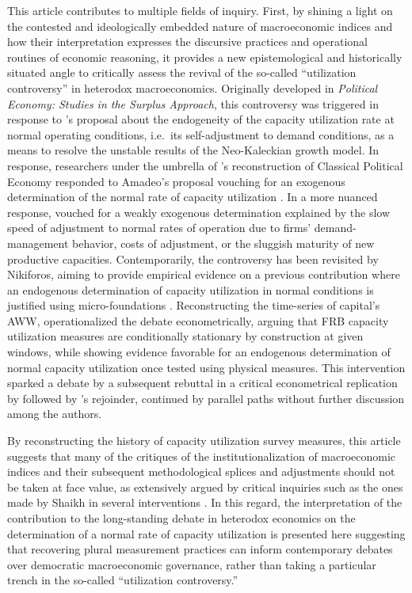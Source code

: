 \documentclass[11pt]{article}
\begin{document}
This article contributes to multiple fields of inquiry. First, by shining a light on the contested and ideologically embedded nature of macroeconomic indices and how their interpretation expresses the discursive practices and operational routines of economic reasoning, it provides a new epistemological and historically situated angle to critically assess the revival of the so-called ``utilization controversy'' in heterodox macroeconomics. Originally developed in \emph{Political Economy: Studies in the Surplus Approach}, this controversy was triggered in response to \citet{amadeo1986}'s proposal about the endogeneity of the capacity utilization rate at normal operating conditions, i.e.\ its self-adjustment to demand conditions, as a means to resolve the unstable results of the Neo-Kaleckian growth model. In response, researchers under the umbrella of \citet{sraffa1960}'s reconstruction of Classical Political Economy responded to Amadeo's proposal vouching for an exogenous determination of the normal rate of capacity utilization \citep{kurz1986}. In a more nuanced response, \citet{ciccone1986} vouched for a weakly exogenous determination explained by the slow speed of adjustment to normal rates of operation due to firms' demand-management behavior, costs of adjustment, or the sluggish maturity of new productive capacities. Contemporarily, the controversy has been revisited by Nikiforos, aiming to provide empirical evidence on a previous contribution where an endogenous determination of capacity utilization in normal conditions is justified using micro-foundations \citep{nikiforos2013}. Reconstructing the time-series of capital's AWW, \citet{nikiforos2016} operationalized the debate econometrically, arguing that FRB capacity utilization measures are conditionally stationary by construction at given windows, while showing evidence favorable for an endogenous determination of normal capacity utilization once tested using physical measures. This intervention sparked a debate by a subsequent rebuttal in a critical econometrical replication by \citet{gahnGonzalez2020} followed by \citet{nikiforos2020}'s rejoinder, continued by parallel paths without further discussion among the authors.

By reconstructing the history of capacity utilization survey measures, this article suggests that many of the critiques of the institutionalization of macroeconomic indices and their subsequent methodological splices and adjustments should not be taken at face value, as extensively argued by critical inquiries such as the ones made by Shaikh in several interventions \citep{shaikh1992,shaikhmoudud2004,shaikh2016}. In this regard, the interpretation of the contribution to the long-standing debate in heterodox economics on the determination of a normal rate of capacity utilization is presented here suggesting that recovering plural measurement practices can inform contemporary debates over democratic macroeconomic governance, rather than taking a particular trench in the so-called ``utilization controversy.''
\end{document}
